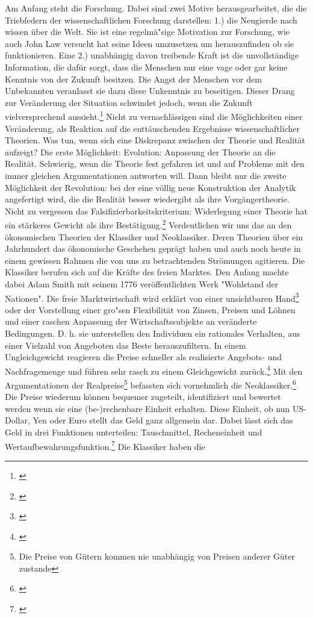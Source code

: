 \documentclass[
        onecolumn,
        a4paper,
        abstracton,
        parskip=half
        ,final
        ]{scrartcl}
\begin{document}
Am Anfang steht die Forschung. Dabei sind zwei Motive herausgearbeitet, die die Triebfedern der wissenschaftlichen Forschung darstellen:
1.) die Neugierde nach wissen {\"u}ber die Welt. Sie ist eine regelm{\"a}{"s}ige Motivation zur Forschung, wie auch John Law versucht hat seine Ideen umzusetzen um herauszufinden ob sie funktionieren.
Eine 2.) unabh{\"a}ngig davon treibende Kraft ist die unvollst{\"a}ndige Information, die daf{\"u}r sorgt, dass die Menschen nur eine vage oder gar keine Kenntnis von der Zukunft besitzen. Die Angst der Menschen vor dem Unbekannten veranlasst sie dazu diese Unkenntnis zu beseitigen. Dieser Drang zur Ver{\"a}nderung der Situation schwindet jedoch, wenn die Zukunft vielversprechend aussieht.\footnote[10]{ \citep*[S.11]{bombach1981theorie}} Nicht zu vernachl{\"a}ssigen sind die M{\"o}glichkeiten einer Ver{\"a}nderung, als Reaktion auf die entt{\"a}uschenden Ergebnisse wissenschaftlicher Theorien. Was tun, wenn sich eine Diskrepanz zwischen der Theorie und Realit{\"a}t aufzeigt? Die erste M{\"o}glichkeit: Evolution: Anpassung der Theorie an die Realit{\"a}t. Schwierig, wenn die Theorie fest gefahren ist und auf Probleme mit den immer gleichen Argumentationen antworten will. Dann bleibt nur die zweite M{\"o}glichkeit der Revolution: bei der eine v{\"o}llig neue Konstruktion der Analytik angefertigt wird, die die Realit{\"a}t besser wiedergibt als ihre Vorg{\"a}ngertheorie. Nicht zu vergessen das Falsifizierbarkeitskriterium: Widerlegung einer Theorie hat ein st{\"a}rkeres Gewicht als ihre Best{\"a}tigung.\footnote[11]{\citep*[S.161]{bombach1981theorie}} Verdeutlichen wir uns das an den {\"o}konomischen Theorien der Klassiker und Neoklassiker. Deren Theorien {\"u}ber ein Jahrhundert das {\"o}konomische Geschehen gepr{\"a}gt haben und auch noch heute in einem gewissen Rahmen die von uns zu betrachtenden Str{\"o}mungen agitieren. Die Klassiker berufen sich auf die Kr{\"a}fte des freien Marktes. Den Anfang machte dabei Adam Smith mit seinem 1776 ver{\"o}ffentlichten Werk "Wohlstand der Nationen". Die freie Marktwirtschaft wird erkl{\"a}rt von einer unsichtbaren Hand\footnote[12]{\citep*[S.137]{bombach1981theorie}} oder der Vorstellung einer gro{"s}en Flexibilit{\"a}t von Zinsen, Preisen und L{\"o}hnen und einer raschen Anpassung der Wirtschaftssubjekte an ver{\"a}nderte Bedingungen. D. h. sie unterstellen den Individuen ein rationales Verhalten, aus einer Vielzahl von Angeboten das Beste herauszufiltern. In einem Ungleichgewicht reagieren die Preise schneller als realisierte Angebots- und Nachfragemenge und f{\"u}hren sehr rasch zu einem Gleichgewicht zur{\"u}ck.\footnote[13]{\citep*[S.291]{Basseler2010}} Mit den Argumentationen der Realpreise\footnote[14]{Die Preise von G{\"u}tern kommen nie unabh{\"a}ngig von Preisen anderer G{\"u}ter zustande} befassten sich vornehmlich die Neoklassiker.\footnote[15]{\citep*[S.138]{bombach1981theorie}} Die Preise wiederum k{\"o}nnen bequemer zugeteilt, identifiziert und bewertet werden wenn sie eine (be-)rechenbare Einheit erhalten. Diese Einheit, ob nun US-Dollar, Yen oder Euro stellt das Geld ganz allgemein dar. Dabei l{\"a}sst sich das Geld in drei Funktionen unterteilen: Tauschmittel, Recheneinheit und Wertaufbewahrungsfunktion.\footnote[16]{\citep*[S.417]{Basseler2010}} Die Klassiker haben die 
\end{document}
